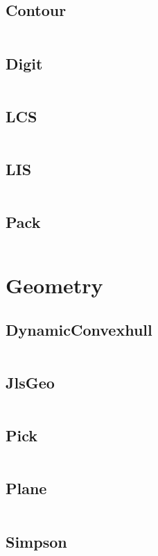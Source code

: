 \documentclass[a4paper,11pt]{article}
\begin{document}
\subsection{Contour}
\inputminted[breaklines]{c++}{05++DynamicProgramming/+Contour.cpp}
\subsection{Digit}
\inputminted[breaklines]{c++}{05++DynamicProgramming/+Digit.cpp}
\subsection{LCS}
\inputminted[breaklines]{c++}{05++DynamicProgramming/+LCS.cpp}
\subsection{LIS}
\inputminted[breaklines]{c++}{05++DynamicProgramming/+LIS.cpp}
\subsection{Pack}
\inputminted[breaklines]{c++}{05++DynamicProgramming/+Pack.cpp}

\newpage
\section{Geometry}
\subsection{DynamicConvexhull}
\inputminted[breaklines]{c++}{06++Geometry/+DynamicConvexhull.cpp}
\subsection{JlsGeo}
\inputminted[breaklines]{c++}{06++Geometry/+JlsGeo.cpp}
\subsection{Pick}
\inputminted[breaklines]{c++}{06++Geometry/+Pick.cpp}
\subsection{Plane}
\inputminted[breaklines]{c++}{06++Geometry/+Plane.cpp}
\subsection{Simpson}
\inputminted[breaklines]{c++}{06++Geometry/+Simpson.cpp}
\end{document}
